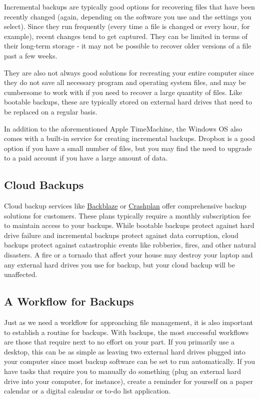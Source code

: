 \documentclass[]{book}
\begin{document}
Incremental backups are typically good options for recovering files that
have been recently changed (again, depending on the software you use and
the settings you select). Since they run frequently (every time a file
is changed or every hour, for example), recent changes tend to get
captured. They can be limited in terms of their long-term storage - it
may not be possible to recover older versions of a file past a few
weeks.

They are also not always good solutions for recreating your entire
computer since they do not save all necessary program and operating
system files, and may be cumbersome to work with if you need to recover
a large quantity of files. Like bootable backups, these are typically
stored on external hard drives that need to be replaced on a regular
basis.

In addition to the aforementioned Apple TimeMachine, the Windows OS also
comes with a built-in service for creating incremental backups. Dropbox
is a good option if you have a small number of files, but you may find
the need to upgrade to a paid account if you have a large amount of
data.

\subsection{Cloud Backups}\label{cloud-backups}

Cloud backup services like \href{https://www.backblaze.com}{Backblaze}
or \href{https://www.code42.com/crashplan/}{Crashplan} offer
comprehensive backup solutions for customers. These plans typically
require a monthly subscription fee to maintain access to your backups.
While bootable backups protect against hard drive failure and
incremental backups protect against data corruption, cloud backups
protect against catastrophic events like robberies, fires, and other
natural disasters. A fire or a tornado that affect your house may
destroy your laptop and any external hard drives you use for backup, but
your cloud backup will be unaffected.

\subsection{A Workflow for Backups}\label{a-workflow-for-backups}

Just as we need a workflow for approaching file management, it is also
important to establish a routine for backups. With backups, the most
successful workflows are those that require next to no effort on your
part. If you primarily use a desktop, this can be as simple as leaving
two external hard drives plugged into your computer since most backup
software can be set to run automatically. If you have tasks that require
you to manually do something (plug an external hard drive into your
computer, for instance), create a reminder for yourself on a paper
calendar or a digital calendar or to-do list application.
\end{document}
